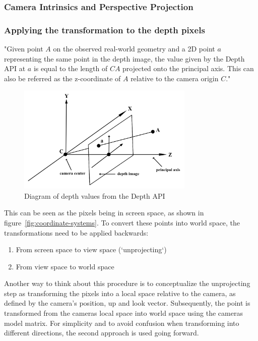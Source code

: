 \cite{de_vries_learn_2020}


\subsubsection{Camera Intrinsics and Perspective Projection}

\subsubsection{Applying the transformation to the depth pixels}
"Given point $A$ on the observed real-world geometry and a 2D point $a$ representing the same point in the depth image,
the value given by the Depth API at $a$ is equal to the length of $CA$ projected onto the principal axis.
This can also be referred as the z-coordinate of $A$ relative to the camera origin $C$."~\parencite{google_llc_arcore_doc}
\begin{figure}[h]
    \centering
    \includegraphics[width=0.75\textwidth]{images/depth-values-diagram}
    \caption{Diagram of depth values from the Depth API}
    \label{fig:diagram-depth-values}
\end{figure}
This can be seen as the pixels being in screen space, as shown in figure~\ref{fig:coordinate-systems}.
To convert these points into world space, the transformations need to be applied backwards:
\begin{enumerate}
    \item From screen space to view space (`unprojecting`)
    \item From view space to world space
\end{enumerate}
Another way to think about this procedure is to conceptualize the unprojecting step as transforming the pixels into a local space
relative to the camera, as defined by the camera's position, up and look vector.
Subsequently, the point is transformed from the cameras local space into world space using the cameras model matrix.
For simplicity and to avoid confusion when transforming into different directions, the second approach is used going forward.


